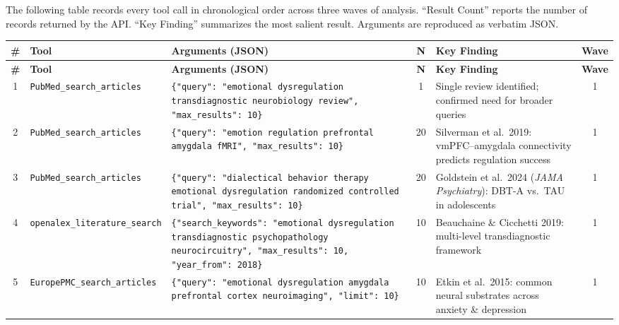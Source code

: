 The following table records every tool call in chronological order across
three waves of analysis.  ``Result Count'' reports the number of records
returned by the API.  ``Key Finding'' summarizes the most salient result.
Arguments are reproduced as verbatim JSON.

\small
\setlength{\LTleft}{-1cm}
\setlength{\LTright}{-1cm}
\begin{longtable}{@{}c p{2.6cm} p{5.2cm} c p{3.8cm} c@{}}
\toprule
\textbf{\#} & \textbf{Tool} & \textbf{Arguments (JSON)} &
\textbf{N} & \textbf{Key Finding} & \textbf{Wave} \\
\midrule
\endfirsthead
\toprule
\textbf{\#} & \textbf{Tool} & \textbf{Arguments (JSON)} &
\textbf{N} & \textbf{Key Finding} & \textbf{Wave} \\
\midrule
\endhead
\bottomrule
\endlastfoot


1 &
\texttt{PubMed\_search\_\allowbreak articles} &
\texttt{\{"query": "emotional dysregulation transdiagnostic neurobiology review", "max\_results": 10\}} &
1 &
Single review identified; confirmed need for broader queries &
1 \\
\midrule

2 &
\texttt{PubMed\_search\_\allowbreak articles} &
\texttt{\{"query": "emotion regulation prefrontal amygdala fMRI", "max\_results": 10\}} &
20 &
Silverman et al.\ 2019: vmPFC--amygdala connectivity predicts regulation success &
1 \\
\midrule

3 &
\texttt{PubMed\_search\_\allowbreak articles} &
\texttt{\{"query": "dialectical behavior therapy emotional dysregulation randomized controlled trial", "max\_results": 10\}} &
20 &
Goldstein et al.\ 2024 (\emph{JAMA Psychiatry}): DBT-A vs.\ TAU in adolescents &
1 \\
\midrule

4 &
\texttt{openalex\_literature\_\allowbreak search} &
\texttt{\{"search\_keywords": "emotional dysregulation transdiagnostic psychopathology neurocircuitry", "max\_results": 10, "year\_from": 2018\}} &
10 &
Beauchaine \& Cicchetti 2019: multi-level transdiagnostic framework &
1 \\
\midrule

5 &
\texttt{EuropePMC\_search\_\allowbreak articles} &
\texttt{\{"query": "emotional dysregulation amygdala prefrontal cortex neuroimaging", "limit": 10\}} &
10 &
Etkin et al.\ 2015: common neural substrates across anxiety \& depression &
1 \\
\midrule


\end{longtable}
